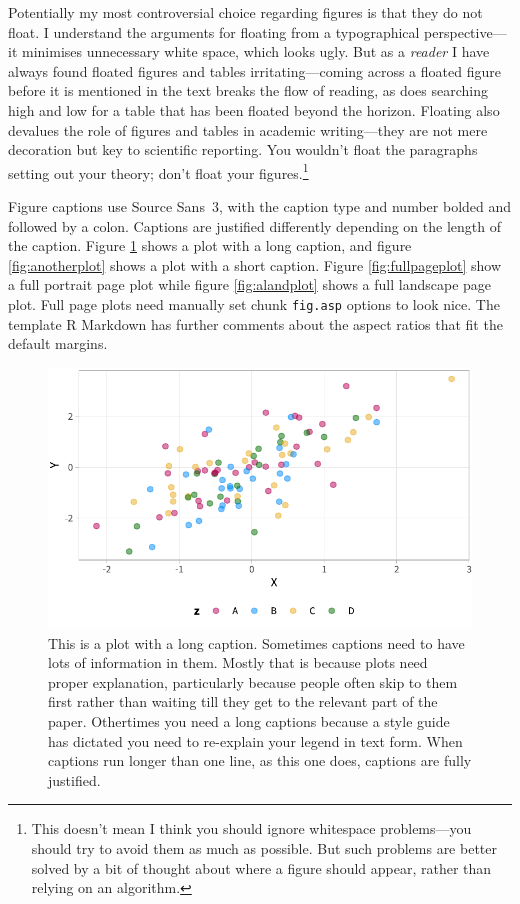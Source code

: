 \documentclass[
  a4paper,
  twoside]{article}
\begin{document}
Potentially my most controversial choice regarding figures is that they do not float. I understand the arguments for floating from a typographical perspective---it minimises unnecessary white space, which looks ugly. But as a \emph{reader} I have always found floated figures and tables irritating---coming across a floated figure before it is mentioned in the text breaks the flow of reading, as does searching high and low for a table that has been floated beyond the horizon. Floating also devalues the role of figures and tables in academic writing---they are not mere decoration but key to scientific reporting. You wouldn't float the paragraphs setting out your theory; don't float your figures.\footnote{This doesn't mean I think you should ignore whitespace problems---you should try to avoid them as much as possible. But such problems are better solved by a bit of thought about where a figure should appear, rather than relying on an algorithm.}

Figure captions use \textsf{Source Sans~3}, with the caption type and number bolded and followed by a colon. Captions are justified differently depending on the length of the caption. Figure \ref{fig:aplot} shows a plot with a long caption, and figure \ref{fig:anotherplot} shows a plot with a short caption. Figure \ref{fig:fullpageplot} show a full portrait page plot while figure \ref{fig:alandplot} shows a full landscape page plot. Full page plots need manually set chunk \texttt{fig.asp} options to look nice. The template R Markdown has further comments about the aspect ratios that fit the default margins.

\begin{figure}[H]

{\centering \includegraphics[width=\linewidth,]{chrisdoc_example_files/figure-latex/aplot-1} 

}

\caption{This is a plot with a long caption. Sometimes captions need to have lots of information in them. Mostly that is because plots need proper explanation, particularly because people often skip to them first rather than waiting till they get to the relevant part of the paper. Othertimes you need a long captions because a style guide has dictated you need to re-explain your legend in text form. When captions run longer than one line, as this one does, captions are fully justified.}\label{fig:aplot}
\end{figure}
\end{document}
